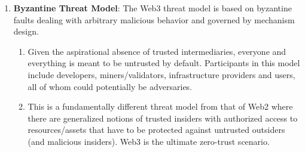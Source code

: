 \begin{enumerate}
\item\textbf{Byzantine Threat Model}: The Web3 threat model is based on byzantine faults dealing with arbitrary malicious behavior and governed by mechanism design.
\begin{enumerate}
\item Given the aspirational absence of trusted intermediaries, everyone and everything is meant to be untrusted by default. Participants in this model include developers, miners/validators, infrastructure providers and users, all of whom could potentially be adversaries.
\item This is a fundamentally different threat model from that of Web2 where there are generalized notions of trusted insiders with authorized access to resources/assets that have to be protected against untrusted outsiders (and malicious insiders). Web3 is the ultimate zero-trust scenario.
\end{enumerate}


\end{enumerate}
